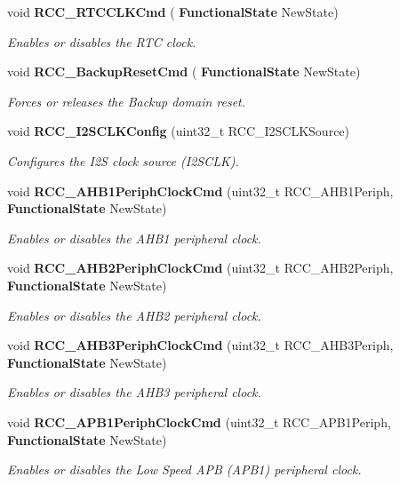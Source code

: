 \begin{DoxyCompactItemize}
void \textbf{ R\+C\+C\+\_\+\+R\+T\+C\+C\+L\+K\+Cmd} (\textbf{ Functional\+State} New\+State)
\begin{DoxyCompactList}\small\item\em Enables or disables the R\+TC clock. \end{DoxyCompactList}\item 
void \textbf{ R\+C\+C\+\_\+\+Backup\+Reset\+Cmd} (\textbf{ Functional\+State} New\+State)
\begin{DoxyCompactList}\small\item\em Forces or releases the Backup domain reset. \end{DoxyCompactList}\item 
void \textbf{ R\+C\+C\+\_\+\+I2\+S\+C\+L\+K\+Config} (uint32\+\_\+t R\+C\+C\+\_\+\+I2\+S\+C\+L\+K\+Source)
\begin{DoxyCompactList}\small\item\em Configures the I2S clock source (I2\+S\+C\+LK). \end{DoxyCompactList}\item 
void \textbf{ R\+C\+C\+\_\+\+A\+H\+B1\+Periph\+Clock\+Cmd} (uint32\+\_\+t R\+C\+C\+\_\+\+A\+H\+B1\+Periph, \textbf{ Functional\+State} New\+State)
\begin{DoxyCompactList}\small\item\em Enables or disables the A\+H\+B1 peripheral clock. \end{DoxyCompactList}\item 
void \textbf{ R\+C\+C\+\_\+\+A\+H\+B2\+Periph\+Clock\+Cmd} (uint32\+\_\+t R\+C\+C\+\_\+\+A\+H\+B2\+Periph, \textbf{ Functional\+State} New\+State)
\begin{DoxyCompactList}\small\item\em Enables or disables the A\+H\+B2 peripheral clock. \end{DoxyCompactList}\item 
void \textbf{ R\+C\+C\+\_\+\+A\+H\+B3\+Periph\+Clock\+Cmd} (uint32\+\_\+t R\+C\+C\+\_\+\+A\+H\+B3\+Periph, \textbf{ Functional\+State} New\+State)
\begin{DoxyCompactList}\small\item\em Enables or disables the A\+H\+B3 peripheral clock. \end{DoxyCompactList}\item 
void \textbf{ R\+C\+C\+\_\+\+A\+P\+B1\+Periph\+Clock\+Cmd} (uint32\+\_\+t R\+C\+C\+\_\+\+A\+P\+B1\+Periph, \textbf{ Functional\+State} New\+State)
\begin{DoxyCompactList}\small\item\em Enables or disables the Low Speed A\+PB (A\+P\+B1) peripheral clock. \end{DoxyCompactList}\item 

\end{DoxyCompactItemize}
